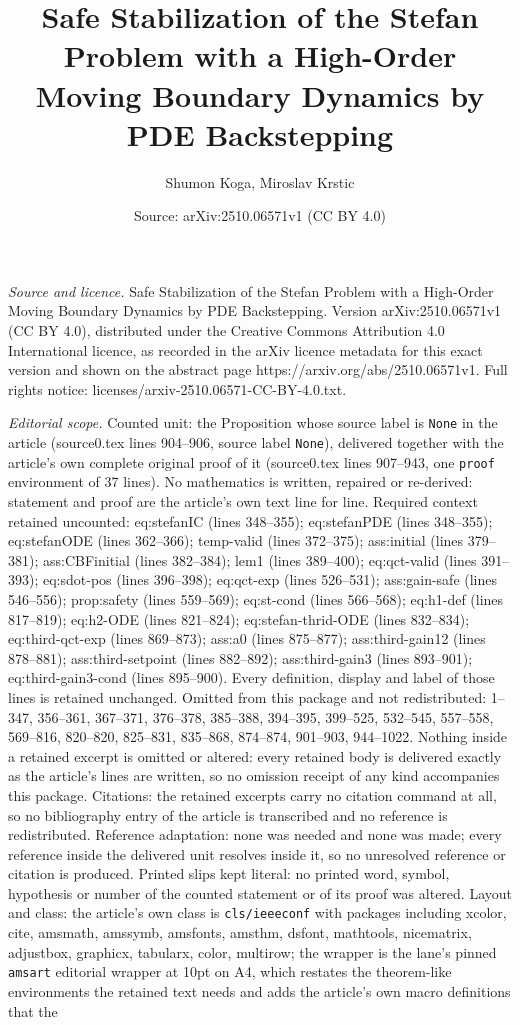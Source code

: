 \documentclass[10pt,a4paper]{amsart}
\title[Safe Stabilization of the Stefan Problem with a High-Order M]{Safe Stabilization of the Stefan Problem with a High-Order Moving Boundary Dynamics by PDE Backstepping}
\author{Shumon Koga, Miroslav Krstic}
\date{Source: arXiv:2510.06571v1 (CC BY 4.0)}
\begin{document}
\maketitle

\noindent\emph{Source and licence.} Safe Stabilization of the Stefan Problem with a High-Order Moving Boundary Dynamics by PDE Backstepping. Version arXiv:2510.06571v1 (CC BY 4.0), distributed under the Creative Commons Attribution 4.0 International licence, as recorded in the arXiv licence metadata for this exact version and shown on the abstract page https://arxiv.org/abs/2510.06571v1. Full rights notice: licenses/arxiv-2510.06571-CC-BY-4.0.txt.\par\smallskip

\noindent\textit{Editorial scope.} Counted unit: the Proposition whose source label is \texttt{None} in the article (source0.tex lines 904--906, source label \texttt{None}), delivered together with the article's own complete original proof of it (source0.tex lines 907--943, one \texttt{proof} environment of 37 lines). No mathematics is written, repaired or re-derived: statement and proof are the article's own text line for line. Required context retained uncounted: eq:stefanIC (lines 348--355); eq:stefanPDE (lines 348--355); eq:stefanODE (lines 362--366); temp-valid (lines 372--375); ass:initial (lines 379--381); ass:CBFinitial (lines 382--384); lem1 (lines 389--400); eq:qct-valid (lines 391--393); eq:sdot-pos (lines 396--398); eq:qct-exp (lines 526--531); ass:gain-safe (lines 546--556); prop:safety (lines 559--569); eq:st-cond (lines 566--568); eq:h1-def (lines 817--819); eq:h2-ODE (lines 821--824); eq:stefan-thrid-ODE (lines 832--834); eq:third-qct-exp (lines 869--873); ass:a0 (lines 875--877); ass:third-gain12 (lines 878--881); ass:third-setpoint (lines 882--892); ass:third-gain3 (lines 893--901); eq:third-gain3-cond (lines 895--900). Every definition, display and label of those lines is retained unchanged. Omitted from this package and not redistributed: 1--347, 356--361, 367--371, 376--378, 385--388, 394--395, 399--525, 532--545, 557--558, 569--816, 820--820, 825--831, 835--868, 874--874, 901--903, 944--1022. Nothing inside a retained excerpt is omitted or altered: every retained body is delivered exactly as the article's lines are written, so no omission receipt of any kind accompanies this package. Citations: the retained excerpts carry no citation command at all, so no bibliography entry of the article is transcribed and no reference is redistributed. Reference adaptation: none was needed and none was made; every reference inside the delivered unit resolves inside it, so no unresolved reference or citation is produced. Printed slips kept literal: no printed word, symbol, hypothesis or number of the counted statement or of its proof was altered. Layout and class: the article's own class is \texttt{cls/ieeeconf} with packages including xcolor, cite, amsmath, amssymb, amsfonts, amsthm, dsfont, mathtools, nicematrix, adjustbox, graphicx, tabularx, color, multirow; the wrapper is the lane's pinned \texttt{amsart} editorial wrapper at 10pt on A4, which restates the theorem-like environments the retained text needs and adds the article's own macro definitions that the 
\end{document}
